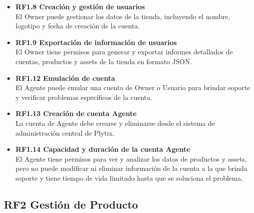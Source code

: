 \documentclass[12pt.a4paper]{article}
\begin{document}
\begin{itemize}
    \item \textbf{RF1.8 Creación y gestión de usuarios} \\
    El Owner puede gestionar los datos de la tienda, incluyendo el nombre, logotipo y fecha de creación de la cuenta.

    \item \textbf{RF1.9 Exportación de información de usuarios} \\
    El Owner tiene permisos para generar y exportar informes detallados de cuentas, productos y assets de la tienda en formato JSON.



    \item \textbf{RF1.12 Emulación de cuenta} \\
    El Agente puede emular una cuenta de Owner o Usuario para brindar soporte y verificar problemas específicos de la cuenta.

    \item \textbf{RF1.13 Creación de cuenta Agente} \\
    La cuenta de Agente debe crearse y eliminarse desde el sistema de administración central de Plytix.


    \item \textbf{RF1.14 Capacidad y duración de la cuenta Agente} \\
    El Agente tiene permisos para ver y analizar los datos de productos y assets, pero no puede modificar ni eliminar información de la cuenta a la que brinda soporte y tiene tiempo de vida limitado hasta que se soluciona el problema.
\end{itemize}

\subsection*{RF2 Gestión de Producto}
\end{document}

